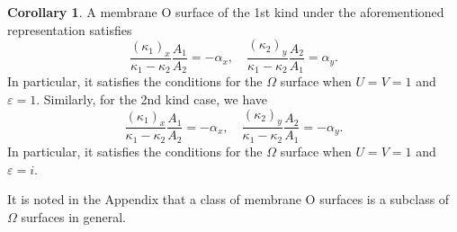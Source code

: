 \documentclass[a4paper]{amsart}
\theoremstyle{definition}
\newtheorem{cor}[thm]{Corollary}
\begin{document}
\begin{cor}
A membrane O surface of the 1st kind under the aforementioned representation satisfies
\begin{equation}
\frac{(\kappa_1)_x}{\kappa_1-\kappa_2} \frac{A_1}{A_2} = -\alpha_x, \quad
\frac{(\kappa_2)_y}{\kappa_1-\kappa_2}\frac{A_2}{A_1} = \alpha_y.
\end{equation}
In particular, it satisfies the conditions for the $\Omega$ surface when $U = V = 1$ and $\varepsilon = 1$.
Similarly, for the 2nd kind case, we have
\begin{equation}
\frac{(\kappa_1)_x}{\kappa_1-\kappa_2} \frac{A_1}{A_2} = -\alpha_x, \quad
\frac{(\kappa_2)_y}{\kappa_1-\kappa_2}\frac{A_2}{A_1} = -\alpha_y.
\end{equation}
In particular, it satisfies the conditions for the $\Omega$ surface when $U = V = 1$ and $\varepsilon = i$.
\end{cor}
%
It is noted in the Appendix that a class of membrane O surfaces is a subclass of $\Omega$ surfaces in general.
%
\end{document}
